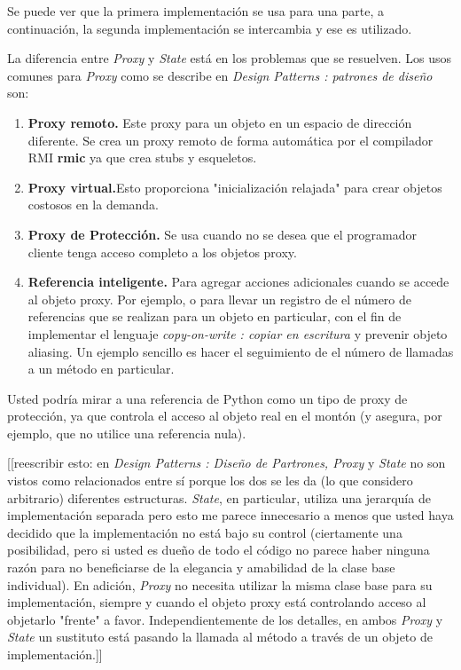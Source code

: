 \documentclass{article}
\begin{document}
Se puede ver que la primera implementación se usa para una parte, a continuación, la segunda implementación se intercambia y ese es utilizado.     \newline

La diferencia entre \textit{Proxy} y \textit{State} está en los problemas que se resuelven. Los usos comunes para \textit{Proxy} como se describe en \textit{Design Patterns : patrones de diseño} son:

\begin{enumerate}[1.]

    \item \textbf{Proxy remoto.} Este proxy para un objeto en un espacio de dirección diferente. Se crea un proxy remoto de forma automática por el compilador RMI \textbf{rmic} ya que crea stubs y esqueletos.
    
    \item \textbf{Proxy virtual.}Esto proporciona "inicialización relajada" para crear objetos costosos en la demanda.
    
    \item \textbf{Proxy de Protección.} Se usa cuando no se desea que el programador cliente tenga acceso completo a los objetos proxy.
    
    \item \textbf{Referencia inteligente.} Para agregar acciones adicionales cuando se accede al objeto proxy. Por ejemplo, o para llevar un registro de el número de referencias que se realizan para un objeto en particular, con el fin de implementar el lenguaje \textit{copy-on-write : copiar en escritura} y prevenir objeto aliasing. Un ejemplo sencillo es hacer el seguimiento de el número de llamadas a un método en particular.
\end{enumerate}

Usted podría mirar a una referencia de Python como un tipo de proxy de protección, ya que controla el acceso al objeto real en el montón (y asegura, por ejemplo, que no utilice una referencia nula). \newline

[[reescribir esto: en \textit{Design Patterns : Diseño de Partrones, Proxy} y \textit{State} no son vistos como relacionados entre sí porque los dos se les da (lo que considero arbitrario) diferentes estructuras.
\textit{State}, en particular, utiliza una jerarquía de implementación separada pero esto me parece innecesario a menos que usted haya decidido que la implementación no está bajo su control (ciertamente una posibilidad, pero si usted es dueño de todo el código no parece haber ninguna razón para no beneficiarse de la elegancia y amabilidad de la clase base individual). En adición, \textit{Proxy} no necesita utilizar la misma clase base para su implementación, siempre y cuando el objeto proxy está controlando acceso al objetarlo "frente" a favor. Independientemente de los detalles, en ambos \textit{Proxy} y \textit{State} un sustituto está pasando la llamada al método a través de un objeto de implementación.]]
\end{document}
